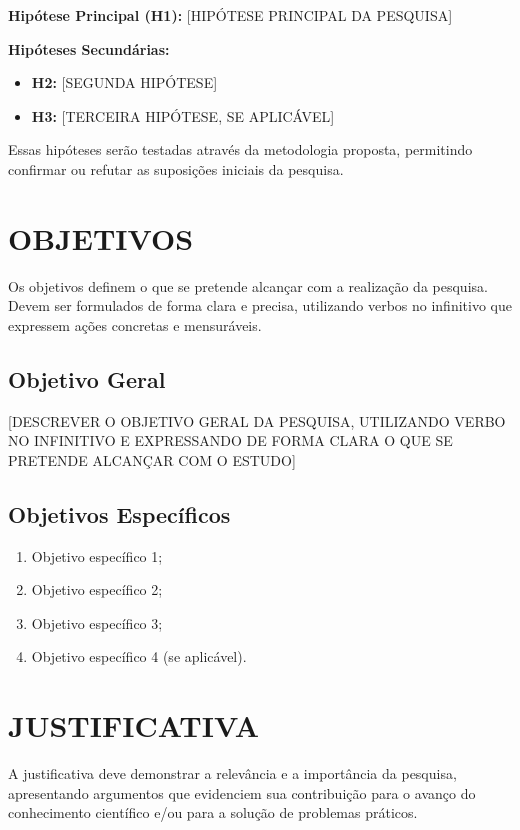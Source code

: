 \textbf{Hipótese Principal (H1):} [HIPÓTESE PRINCIPAL DA PESQUISA]

\textbf{Hipóteses Secundárias:}
\begin{itemize}
    \item \textbf{H2:} [SEGUNDA HIPÓTESE]
    \item \textbf{H3:} [TERCEIRA HIPÓTESE, SE APLICÁVEL]
\end{itemize}

Essas hipóteses serão testadas através da metodologia proposta, permitindo confirmar ou refutar as suposições iniciais da pesquisa.


\section{OBJETIVOS}
\label{sec:objetivos}

Os objetivos definem o que se pretende alcançar com a realização da pesquisa. Devem ser formulados de forma clara e precisa, utilizando verbos no infinitivo que expressem ações concretas e mensuráveis.

\subsection{Objetivo Geral}
\label{subsec:objetivo-geral}

[DESCREVER O OBJETIVO GERAL DA PESQUISA, UTILIZANDO VERBO NO INFINITIVO E EXPRESSANDO DE FORMA CLARA O QUE SE PRETENDE ALCANÇAR COM O ESTUDO]

\subsection{Objetivos Específicos}
\label{subsec:objetivos-especificos}

\begin{enumerate}
    \item Objetivo específico 1;
    \item Objetivo específico 2;
    \item Objetivo específico 3;
    \item Objetivo específico 4 (se aplicável).
\end{enumerate}


\section{JUSTIFICATIVA}
\label{sec:justificativa}

A justificativa deve demonstrar a relevância e a importância da pesquisa, apresentando argumentos que evidenciem sua contribuição para o avanço do conhecimento científico e/ou para a solução de problemas práticos.

